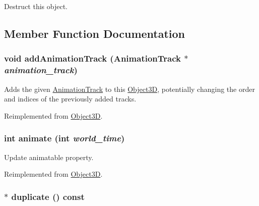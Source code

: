 Destruct this object. 

\subsection{Member Function Documentation}
\hypertarget{classm3g_1_1Material_415c0b110f95410ded9b85e5d99a496b}{
\subsubsection[{addAnimationTrack}]{\setlength{\rightskip}{0pt plus 5cm}void addAnimationTrack ({\bf AnimationTrack} $\ast$ {\em animation\_\-track})}}
\label{classm3g_1_1Material_415c0b110f95410ded9b85e5d99a496b}


Adds the given \hyperlink{classm3g_1_1AnimationTrack}{AnimationTrack} to this \hyperlink{classm3g_1_1Object3D}{Object3D}, potentially changing the order and indices of the previously added tracks. 

Reimplemented from \hyperlink{classm3g_1_1Object3D_415c0b110f95410ded9b85e5d99a496b}{Object3D}.\hypertarget{classm3g_1_1Material_8aad1ceab4c2a03609c8a42324ce484d}{
\subsubsection[{animate}]{\setlength{\rightskip}{0pt plus 5cm}int animate (int {\em world\_\-time})}}
\label{classm3g_1_1Material_8aad1ceab4c2a03609c8a42324ce484d}


Update animatable property. 

Reimplemented from \hyperlink{classm3g_1_1Object3D_8aad1ceab4c2a03609c8a42324ce484d}{Object3D}.\hypertarget{classm3g_1_1Material_1bdbc2f934efac291bf7d8f49ba10dda}{
\subsubsection[{duplicate}]{ $\ast$ duplicate () const}}
\label{classm3g_1_1Material_1bdbc2f934efac291bf7d8f49ba10dda}


